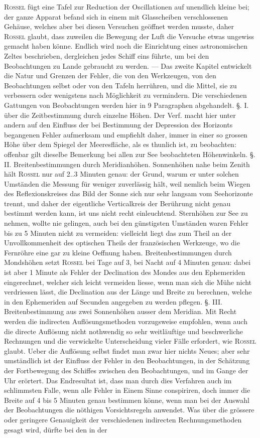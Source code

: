 \textsc{Rossel} fügt eine Tafel zur Reduction der Oscillationen auf unendlich kleine bei; der ganze Apparat befand sich in einem mit Glasscheiben verschlossenen Gehäuse, welches aber bei diesen Versuchen geöffnet werden musste, daher \textsc{Rossel} glaubt, dass zuweilen die Bewegung der Luft die Versuche etwas ungewiss gemacht haben könne. Endlich wird noch die Einrichtung eines astronomischen Zeltes beschrieben, dergleichen jedes Schiff eins führte, um bei den Beobachtungen zu Lande gebraucht zu werden. — Das zweite Kapitel entwickelt die Natur und Grenzen der Fehler, die von den Werkzeugen, von den Beobachtungen selbst oder von den Tafeln herrühren, und die Mittel, sie zu verbessern oder wenigstens nach Möglichkeit zu vermindern. Die verschiedenen Gattungen von Beobachtungen werden hier in 9 Paragraphen abgehandelt. §. I. über die Zeitbestimmung durch einzelne Höhen. Der Verf. macht hier unter andern auf den Einfluss der bei Bestimmung der Depression des Horizonts begangenen Fehler aufmerksam und empfiehlt daher, immer in einer so grossen Höhe über dem Spiegel der Meeresfläche, als es thunlich ist, zu beobachten: offenbar gilt dieselbe Bemerkung bei allen zur See beobachteten Höhenwinkeln. §. II. Breitenbestimmungen durch Meridianhöhen. Sonnenhöhen nahe beim Zenith hält \textsc{Rossel} nur auf 2..3 Minuten genau: der Grund, warum er unter solchen Umständen die Messung für weniger zuverlässig hält, weil nemlich beim Wiegen des Reflexionskreises das Bild der Sonne sich nur sehr langsam vom Seehorizonte trennt, und daher der eigentliche Verticalkreis der Berührung nicht genau bestimmt werden kann, ist uns nicht recht einleuchtend. Sternhöhen zur See zu nehmen, wollte nie gelingen, auch bei den günstigsten Umständen waren Fehler bis zu 5 Minuten nicht zu vermeiden: vielleicht liegt das zum Theil an der Unvollkommenheit des optischen Theils der französischen Werkzeuge, wo die Fernröhre eine gar zu kleine Oeffnung haben. Breitenbestimmungen durch Mondshöhen setzt \textsc{Rossel} bei Tage auf 3, bei Nacht auf 4 Minuten genau: dabei ist aber 1 Minute als Fehler der Declination des Mondes aus den Ephemeriden eingerechnet, welcher sich leicht vermeiden liesse, wenn man sich die Mühe nicht verdriessen lässt, die Declination aus der Länge und Breite zu berechnen, welche in den Ephemeriden auf Secunden angegeben zu werden pflegen. §. III. Breitenbestimmung aus zwei Sonnenhöhen ausser dem Meridian. Mit Recht werden die indirecten Auflösungsmethoden vorzugsweise empfohlen, wenn auch die directe Auflösung nicht nothwendig so sehr weitläuftige und beschwerliche Rechnungen und die verwickelte Unterscheidung vieler Fälle erfordert, wie \textsc{Rossel} glaubt. Ueber die Auflösung selbst findet man zwar hier nichts Neues; aber sehr umständlich ist der Einfluss der Fehler in den Beobachtungen, in der Schätzung der Fortbewegung des Schiffes zwischen den Beobachtungen, und im Gange der Uhr erörtert. Das Endresultat ist, dass man durch dies Verfahren auch im schlimmsten Falle, wenn alle Fehler in Einem Sinne conspiriren, doch immer die Breite auf 4 bis 5 Minuten genau bestimmen könne, wenn man bei der Auswahl der Beobachtungen die nöthigen Vorsichtsregeln anwendet. Was über die grössere oder geringere Genauigkeit der verschiedenen indirecten Rechnungsmethoden gesagt wird, dürfte bei den in der 